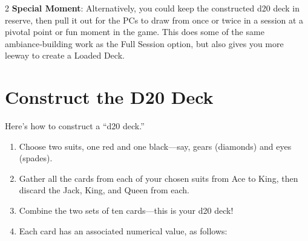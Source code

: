 \begin{multicols}{2}
\textbf{Special Moment}: Alternatively, you could keep the constructed d20 deck in reserve, then pull it out for the PCs to draw from once or twice in a session at a pivotal point or fun moment in the game. This does some of the same ambiance‑building work as the Full Session option, but also gives you more leeway to create a Loaded Deck.

\section{Construct the D20 Deck}

Here’s how to construct a “d20 deck.” 

\begin{enumerate}
\item Choose two suits, one red and one black—say, gears (diamonds) and eyes (spades). 
\item Gather all the cards from each of your chosen suits from Ace to King, then discard the Jack, King, and Queen from each. 
\item Combine the two sets of ten cards—this is your d20 deck! 
\item Each card has an associated numerical value, as follows: 
\end{enumerate} 
    
\end{multicols}

